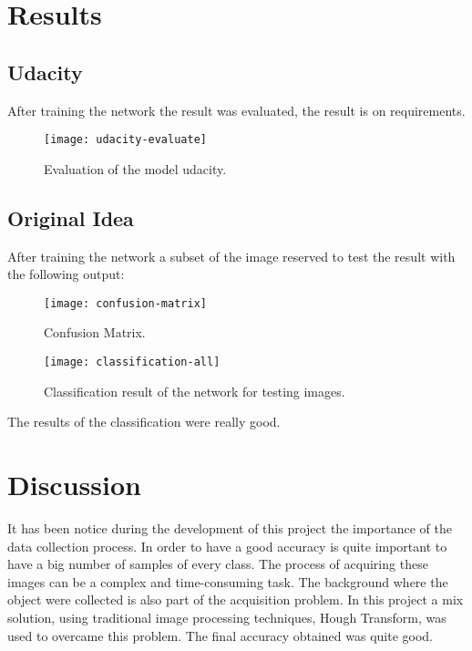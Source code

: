 \documentclass[10pt,journal,compsoc]{IEEEtran}
\begin{document}
\section{Results}

\subsection{Udacity}

After training the network the result was evaluated, the result is on requirements.

\begin{figure}[h]
\centering
\texttt{[image: udacity-evaluate]}
\caption{Evaluation of the model udacity.}
\label{fig:figure4}
\end{figure}

\subsection{Original Idea}

After training the network a subset of the image reserved to test the result with the following output:

\begin{figure}[h]
\centering
\texttt{[image: confusion-matrix]}
\caption{Confusion Matrix.}
\label{fig:figure5}
\end{figure}


\begin{figure}[h]
\centering
\texttt{[image: classification-all]}
\caption{Classification result of the network for testing images.}
\label{fig:figure6}
\end{figure}

The results of the classification were really good. 

\section{Discussion}

It has been notice during the development of this project the importance of the data collection process. In order to have a good accuracy is quite important to have a big number of samples of every class. The process of acquiring these images can be a complex and time-consuming task. The background where the object were collected is also part of the acquisition problem. In this project a mix solution, using traditional image processing techniques, Hough Transform, was used to overcame this problem. The final accuracy obtained was quite good. 
\end{document}
